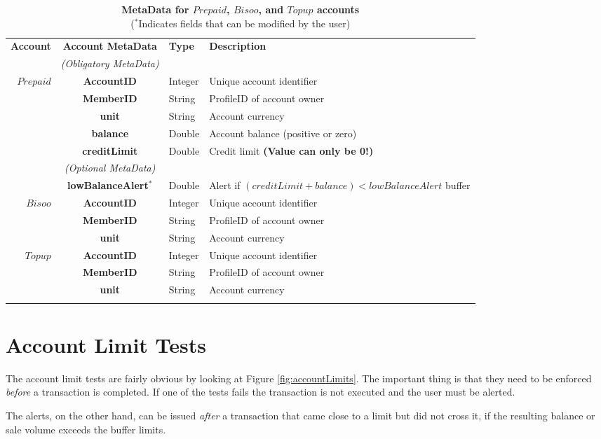 \begin{table}[H]
\begin{centering}
\small
{
\begin{tabular}{ r | c | l | l }
\hline
\textbf{Account}	& {\bf Account MetaData} & {\bf Type} & {\bf Description} \\
\Xhline{1.5pt}
			 & \emph{(Obligatory MetaData)}& & \\
\cline{2-2}
$Prepaid$ 	& {\bf AccountID}			&Integer	& Unique account identifier \\
			& {\bf MemberID}			&String	& ProfileID of account owner \\
			& {\bf unit}					&String	& Account currency \\
			& {\bf balance}				&Double	& Account balance (positive or zero) \\
			& {\bf creditLimit}			&Double	& Credit limit {\bf (Value can only be 0!)} \\
\cline{2-2}
			 & \emph{(Optional MetaData)}& & \\
\cline{2-2}
			& {\bf lowBalanceAlert$^*$}		&Double	& Alert if $(creditLimit + balance) < lowBalanceAlert$ buffer \\
\Xhline{1.5pt}
$Bisoo$ 		& {\bf AccountID}			&Integer	& Unique account identifier \\
			& {\bf MemberID}			&String	& ProfileID of account owner \\
			& {\bf unit}					&String	& Account currency \\
\Xhline{1.5pt}
$Topup$ 		& {\bf AccountID}			&Integer	& Unique account identifier \\
			& {\bf MemberID}			&String	& ProfileID of account owner \\
			& {\bf unit}					&String	& Account currency \\
\Xhline{1.5pt}
\end{tabular}
}
\caption{\small\textbf{MetaData for $Prepaid$, $Bisoo$, and $Topup$ accounts}\\
($^*$Indicates fields that can be modified by the user)}
\label{tab:AccountMetaData2}
\end{centering}
\end{table}

\section{Account Limit Tests}
The account limit tests are fairly obvious by looking at Figure \ref{fig:accountLimits}. The important thing is that they need to be enforced \emph{before} a transaction is completed. If one of the tests fails the transaction is not executed and the user must be alerted.

The alerts, on the other hand, can be issued \emph{after} a transaction that came close to a limit but did not cross it, if the resulting balance or sale volume exceeds the buffer limits.



























